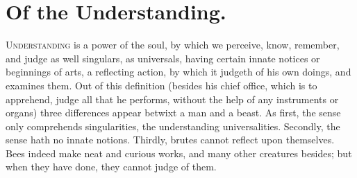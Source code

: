 {%
\section{Of the Understanding.}

\lettrine{U}{nderstanding} is a power of the soul, by which we perceive, know,
remember, and judge as well singulars, as universals, having certain
innate notices or beginnings of arts, a reflecting action, by which it
judgeth of his own doings, and examines them. Out of this definition
(besides his chief office, which is to apprehend, judge all that he
performs, without the help of any instruments or organs) three
differences appear betwixt a man and a beast. As first, the sense only
comprehends singularities, the understanding universalities. Secondly,
the sense hath no innate notions. Thirdly, brutes cannot reflect upon
themselves. Bees indeed make neat and curious works, and many other
creatures besides; but when they have done, they cannot judge of them.

}
